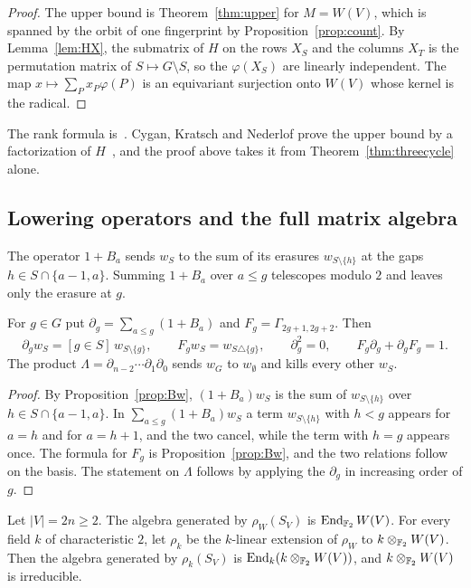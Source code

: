 \begin{proof}
The upper bound is Theorem~\ref{thm:upper} for $M=W(V)$, which is spanned by the orbit of one fingerprint by Proposition~\ref{prop:count}. By Lemma~\ref{lem:HX}, the submatrix of $H$ on the rows $X_S$ and the columns $X_T$ is the permutation matrix of $S\mapsto G\setminus S$, so the $\varphi(X_S)$ are linearly independent. The map $x\mapsto\sum_{P}x_P\varphi(P)$ is an equivariant surjection onto $W(V)$ whose kernel is the radical.
\end{proof}

The rank formula is~\cite[Cor.~3.5]{CKN18}. Cygan, Kratsch and Nederlof prove the upper bound by a factorization of $H$~\cite[Thm.~3.4]{CKN18}, and the proof above takes it from Theorem~\ref{thm:threecycle} alone.

\subsection{Lowering operators and the full matrix algebra}

The operator $1+B_a$ sends $w_S$ to the sum of its erasures $w_{S\setminus\{h\}}$ at the gaps $h\in S\cap\{a-1,a\}$. Summing $1+B_a$ over $a\le g$ telescopes modulo $2$ and leaves only the erasure at $g$.

\begin{proposition}\label{prop:lower}
For $g\in G$ put $\partial_g=\sum_{a\le g}(1+B_a)$ and $F_g=\Gamma_{2g+1,2g+2}$. Then
\[
\partial_{g}w_S=[g\in S]\,w_{S\setminus\{g\}},\qquad F_{g}w_S=w_{S\triangle\{g\}},\qquad \partial_g^2=0,\qquad F_g\partial_g+\partial_{g}F_g=1 .
\]
The product $\Lambda=\partial_{n-2}\cdots\partial_1\partial_0$ sends $w_G$ to $w_\emptyset$ and kills every other $w_S$.
\end{proposition}

\begin{proof}
By Proposition~\ref{prop:Bw}, $(1+B_a)w_S$ is the sum of $w_{S\setminus\{h\}}$ over $h\in S\cap\{a-1,a\}$. In $\sum_{a\le g}(1+B_a)w_S$ a term $w_{S\setminus\{h\}}$ with $h<g$ appears for $a=h$ and for $a=h+1$, and the two cancel, while the term with $h=g$ appears once. The formula for $F_g$ is Proposition~\ref{prop:Bw}, and the two relations follow on the basis. The statement on $\Lambda$ follows by applying the $\partial_g$ in increasing order of $g$.
\end{proof}

\begin{theorem}\label{thm:burnside}
Let $|V|=2n\ge2$. The algebra generated by $\rho_W(S_V)$ is $\operatorname{End}_{\mathbb{F}_2}W(V)$. For every field $k$ of characteristic $2$, let $\rho_k$ be the $k$-linear extension of $\rho_W$ to $k\otimes_{\mathbb{F}_2}W(V)$. Then the algebra generated by $\rho_k(S_V)$ is $\operatorname{End}_k(k\otimes_{\mathbb{F}_2}W(V))$, and $k\otimes_{\mathbb{F}_2}W(V)$ is irreducible.
\end{theorem}

